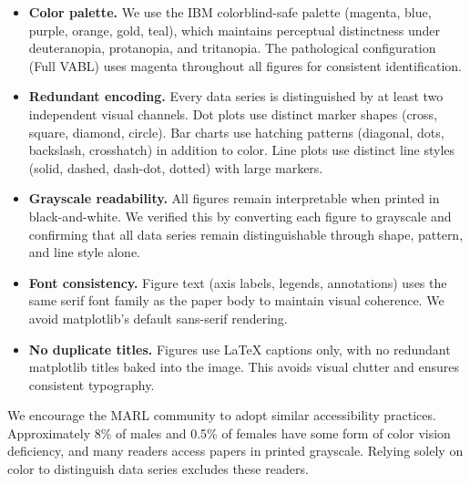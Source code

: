 \documentclass{article}
\theoremstyle{plain}
\theoremstyle{definition}
\theoremstyle{remark}
\begin{document}
\begin{itemize}
    \item \textbf{Color palette.} We use the IBM colorblind-safe palette
    (magenta, blue, purple, orange, gold, teal), which maintains perceptual
    distinctness under deuteranopia, protanopia, and tritanopia. The
    pathological configuration (Full VABL) uses magenta throughout all
    figures for consistent identification.

    \item \textbf{Redundant encoding.} Every data series is distinguished by
    at least two independent visual channels. Dot plots use distinct marker
    shapes (cross, square, diamond, circle). Bar charts use hatching patterns
    (diagonal, dots, backslash, crosshatch) in addition to color. Line plots
    use distinct line styles (solid, dashed, dash-dot, dotted) with large
    markers.

    \item \textbf{Grayscale readability.} All figures remain interpretable
    when printed in black-and-white. We verified this by converting each
    figure to grayscale and confirming that all data series remain
    distinguishable through shape, pattern, and line style alone.

    \item \textbf{Font consistency.} Figure text (axis labels, legends,
    annotations) uses the same serif font family as the paper body to
    maintain visual coherence. We avoid matplotlib's default sans-serif
    rendering.

    \item \textbf{No duplicate titles.} Figures use LaTeX captions only,
    with no redundant matplotlib titles baked into the image. This avoids
    visual clutter and ensures consistent typography.
\end{itemize}

We encourage the MARL community to adopt similar accessibility practices.
Approximately 8\% of males and 0.5\% of females have some form of color
vision deficiency, and many readers access papers in printed grayscale.
Relying solely on color to distinguish data series excludes these readers.


\newpage

\end{document}
